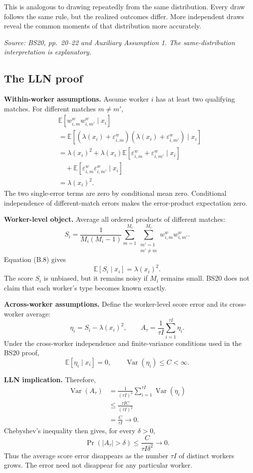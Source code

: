 \documentclass[11pt]{article}
\begin{document}
This is analogous to drawing repeatedly from the same distribution.  Every
draw follows the same rule, but the realized outcomes differ.  More
independent draws reveal the common moments of that distribution more
accurately.

\textit{Source: BS20, pp.\ 20--22 and Auxiliary Assumption 1.  The
same-distribution interpretation is explanatory.}

\subsection{The LLN proof}

\textbf{Within-worker assumptions.}
Assume worker \(i\) has at least two qualifying matches.  For different
matches \(m\neq m'\),
\[
\begin{aligned}
&\mathbb E[
w^w_{i,m}w^w_{i,m'}\mid x_i]\\
&=
\mathbb E[
(\lambda(x_i)+\varepsilon^w_{i,m})
(\lambda(x_i)+\varepsilon^w_{i,m'})
\mid x_i]\\
&=
\lambda(x_i)^2
+\lambda(x_i)
\mathbb E[
\varepsilon^w_{i,m}+\varepsilon^w_{i,m'}\mid x_i]\\
&\quad+
\mathbb E[
\varepsilon^w_{i,m}\varepsilon^w_{i,m'}\mid x_i]\\
&=
\lambda(x_i)^2.
\end{aligned}
\tag{B.8}
\]
The two single-error terms are zero by conditional mean zero.  Conditional
independence of different-match errors makes the error-product expectation
zero.

\textbf{Worker-level object.}
Average all ordered products of different matches:
\[
S_i
=
\frac{1}{M_i(M_i-1)}
\sum_{m=1}^{M_i}
\sum_{\substack{m'=1\\m'\neq m}}^{M_i}
w^w_{i,m}w^w_{i,m'}.
\tag{B.9}
\]
Equation (B.8) gives
\[
\mathbb E[S_i\mid x_i]=\lambda(x_i)^2.
\tag{B.10}
\]
The score \(S_i\) is unbiased, but it remains noisy if \(M_i\) remains
small.  BS20 does not claim that each worker's type becomes known exactly.

\textbf{Across-worker assumptions.}
Define the worker-level score error and its cross-worker average:
\[
\eta_i=S_i-\lambda(x_i)^2,
\qquad
A_\tau=\frac{1}{\tau I}\sum_{i=1}^{\tau I}\eta_i.
\tag{B.11}
\]
Under the cross-worker independence and finite-variance conditions used in
the BS20 proof,
\[
\mathbb E[\eta_i\mid x_i]=0,
\qquad
\operatorname{Var}(\eta_i)\leq C<\infty.
\tag{B.12}
\]

\textbf{LLN implication.}
Therefore,
\[
\begin{aligned}
\operatorname{Var}(A_\tau)
&=
\frac{1}{(\tau I)^2}
\sum_{i=1}^{\tau I}\operatorname{Var}(\eta_i)\\
&\leq
\frac{\tau I C}{(\tau I)^2}\\
&=
\frac{C}{\tau I}
\longrightarrow0.
\end{aligned}
\tag{B.13}
\]
Chebyshev's inequality then gives, for every \(\delta>0\),
\[
\Pr(|A_\tau|>\delta)
\leq
\frac{C}{\tau I\delta^2}
\longrightarrow0.
\tag{B.14}
\]
Thus the average score error disappears as the number \(\tau I\) of
distinct workers grows.  The error need not disappear for any particular
worker.
\end{document}
